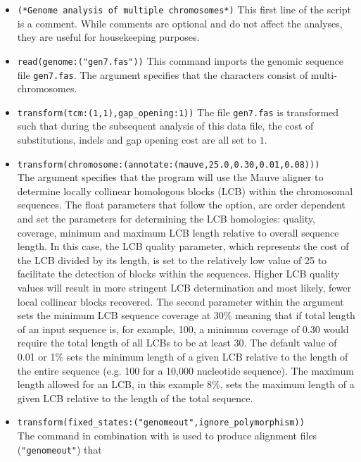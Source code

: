 \begin{itemize}
\item \texttt{(*Genome analysis of multiple chromosomes*)} This first line of the script is a comment. While 
comments are optional and do not affect the analyses, they are useful for housekeeping purposes.
\item \texttt{read(genome:("gen7.fas"))} This command imports the genomic sequence file \texttt{gen7.fas}. The 
argument  specifies that the characters consist of multi-chromosomes. 
\item \texttt{transform(tcm:(1,1),gap\_opening:1))} The file \texttt{gen7.fas} is transformed such that during the 
subsequent analysis of this data file, the cost of substitutions, indels and gap opening cost are all set to $1$.
\item \texttt{transform(chromosome:(annotate:(mauve,25.0,0.30,0.01,0.08)))} \\The argument 
 specifies that the program will use the Mauve aligner \cite{darlingetal2004} 
to determine locally collinear homologous blocks (LCB) within the chromosomal sequences.  The float parameters 
that follow the  option, are order dependent and set the parameters for determining the LCB 
homologies: quality, coverage, minimum and maximum LCB length relative to overall sequence length. In this case, 
the LCB quality parameter, which represents the cost of the LCB divided by its length,
 is set to the relatively low value of 25 to facilitate the detection of blocks within the sequences.  Higher LCB 
 quality values will result in more stringent LCB determination and most likely, fewer local collinear blocks recovered.  The 
 second parameter within the argument  sets the minimum LCB sequence coverage 
 at  30\% meaning that if total length of an input sequence is, for example, 100, a minimum coverage of 0.30 would 
 require  the total length of all LCBs to be at least 30. The default value of 0.01 or 1\% sets the minimum length of a 
 given LCB  relative to the length of the entire sequence (e.g. 100 for a 10,000 nucleotide sequence). The maximum 
 length allowed for an LCB, in this example 8\%, sets the maximum length of a given LCB relative to the length of 
 the total sequence.
\item \texttt{transform(fixed\_states:("genomeout",ignore\_polymorphism))}  \\The {} command 
in combination with  is used to produce alignment files  (\texttt{"genomeout"}) that 

\end{itemize}
